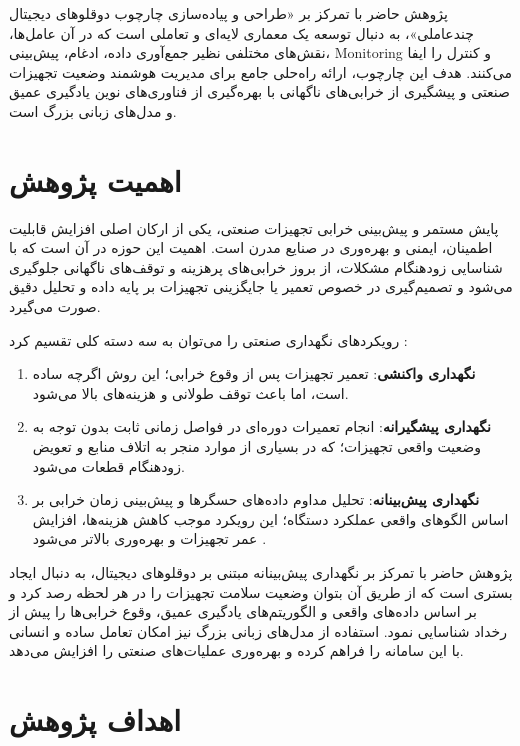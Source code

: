 \documentclass[a4paper,fleqn]{report}
\begin{document}
پژوهش حاضر با تمرکز بر «طراحی و پیاده‌سازی چارچوب دوقلوهای دیجیتال چندعاملی»، به دنبال توسعه یک معماری لایه‌ای و تعاملی است که در آن عامل‌ها، نقش‌های مختلفی نظیر جمع‌آوری داده، ادغام، پیش‌بینی، \gls{Monitoring} و کنترل را ایفا می‌کنند. هدف این چارچوب، ارائه راه‌حلی جامع برای مدیریت هوشمند وضعیت تجهیزات صنعتی و پیشگیری از خرابی‌های ناگهانی با بهره‌گیری از فناوری‌های نوین یادگیری عمیق و مدل‌های زبانی بزرگ است.
  


\section{اهمیت پژوهش}

پایش مستمر و پیش‌بینی خرابی تجهیزات صنعتی، یکی از ارکان اصلی افزایش قابلیت اطمینان، ایمنی و بهره‌وری در صنایع مدرن است. اهمیت این حوزه در آن است که با شناسایی زودهنگام مشکلات، از بروز خرابی‌های پرهزینه و توقف‌های ناگهانی جلوگیری می‌شود و تصمیم‌گیری در خصوص تعمیر یا جایگزینی تجهیزات بر پایه داده و تحلیل دقیق صورت می‌گیرد.

رویکردهای نگهداری صنعتی را می‌توان به سه دسته کلی تقسیم کرد \cite{ismail2025systematic}:
\begin{enumerate}
	\item \textbf{نگهداری واکنشی}: تعمیر تجهیزات پس از وقوع خرابی؛ این روش اگرچه ساده است، اما باعث توقف طولانی و هزینه‌های بالا می‌شود.
	\item \textbf{نگهداری پیشگیرانه}: انجام تعمیرات دوره‌ای در فواصل زمانی ثابت بدون توجه به وضعیت واقعی تجهیزات؛ که در بسیاری از موارد منجر به اتلاف منابع و تعویض زودهنگام قطعات می‌شود.
	\item \textbf{نگهداری پیش‌بینانه}: تحلیل مداوم داده‌های حسگرها و پیش‌بینی زمان خرابی بر اساس الگوهای واقعی عملکرد دستگاه؛ این رویکرد موجب کاهش هزینه‌ها، افزایش عمر تجهیزات و بهره‌وری بالاتر می‌شود \cite{rojek2023artificial}.
\end{enumerate}
پژوهش حاضر با تمرکز بر نگهداری پیش‌بینانه مبتنی بر دوقلوهای دیجیتال، به دنبال ایجاد بستری است که از طریق آن بتوان وضعیت سلامت تجهیزات را در هر لحظه رصد کرد و بر اساس داده‌های واقعی و الگوریتم‌های یادگیری عمیق، وقوع خرابی‌ها را پیش از رخداد شناسایی نمود. استفاده از مدل‌های زبانی بزرگ نیز امکان تعامل ساده و انسانی با این سامانه را فراهم کرده و بهره‌وری عملیات‌های صنعتی را افزایش می‌دهد.



\section{اهداف پژوهش}
\end{document}
